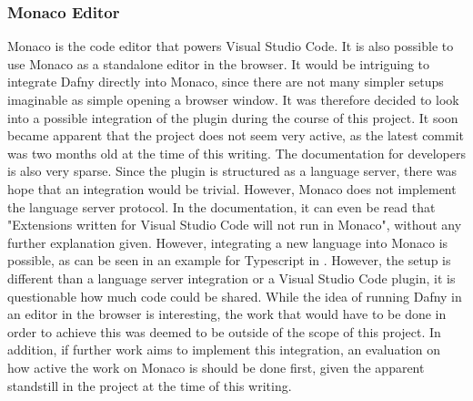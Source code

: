 \subsubsection{Monaco Editor}
Monaco\cite{monaco} is the code editor that powers Visual Studio Code. It is also possible to use Monaco as a standalone editor in the browser. It would be intriguing to integrate Dafny directly into Monaco, since there are not many simpler setups imaginable as simple opening a browser window. It was therefore decided to look into a possible integration of the plugin during the course of this project. \newline
 It soon became apparent that the project does not seem very active, as the latest commit was two months old at the time of this writing. The documentation for developers is also very sparse. Since the plugin is structured as a language server, there was hope that an integration would be trivial. However, Monaco does not implement the language server protocol. In the documentation, it can even be read that "Extensions written for Visual Studio Code will not run in Monaco"\cite{monaco}, without any further explanation given. \newline
 However, integrating a new language into Monaco is possible, as can be seen in an example for Typescript in  \cite{monacoType}. However, the setup is different than a language server integration or a Visual Studio Code plugin, it is questionable how much code could be shared. While the idea of running Dafny in an editor in the browser is interesting, the work that would have to be done in order to achieve this was deemed to be outside of the scope of this project. In addition, if further work aims to implement this integration, an evaluation on how active the work on Monaco is should be done first, given the apparent standstill in the project at the time of this writing.\newline